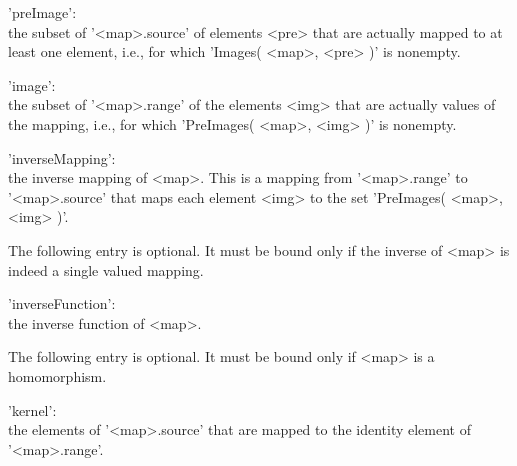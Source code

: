 'preImage': \\
        the subset  of  '<map>.source'   of   elements   <pre>  that  are
        actually mapped  to at   least  one   element, i.e.,   for  which
        'Images( <map>, <pre> )' is nonempty.

'image': \\
        the  subset   of  '<map>.range'  of    the elements <img>    that
        are   actually  values of     the  mapping,   i.e.,   for   which
        'PreImages( <map>, <img> )' is nonempty.

'inverseMapping': \\
        the    inverse  mapping  of  <map>.  This  is    a   mapping from
        '<map>.range'  to    '<map>.source'  that    maps  each   element
        <img> to the set 'PreImages( <map>, <img> )'.

The following entry is optional.  It must be bound only  if  the  inverse
of <map> is indeed a single valued mapping.

'inverseFunction': \\
        the inverse function of <map>.

The  following entry is  optional.  It must be  bound only  if <map> is a
homomorphism.

'kernel': \\
        the  elements    of '<map>.source'  that   are  mapped   to   the
        identity element of '<map>.range'.




